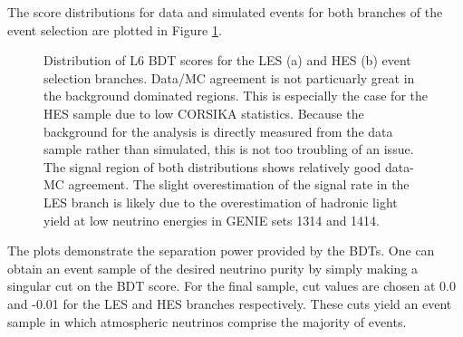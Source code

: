 \documentclass{gatech-thesis}
\begin{document}
The score distributions for data and simulated events for both branches of the event selection are plotted in Figure \ref{fig:BDTScoreDistros}.
\begin{figure}
\centering
{}
\caption[L6 BDT Score Distribution]{Distribution of L6 BDT scores for the LES (a) and HES (b) event selection branches. Data/MC agreement is not particuarly great in the background dominated regions. This is especially the case for the HES sample due to low CORSIKA statistics. Because the background for the analysis is directly measured from the data sample rather than simulated, this is not too troubling of an issue. The signal region of both distributions shows relatively good data-MC agreement. The slight overestimation of the signal rate in the LES branch is likely due to the overestimation of hadronic light yield at low neutrino energies in GENIE sets 1314 and 1414.}
\label{fig:BDTScoreDistros}
\end{figure}
The plots demonstrate the separation power provided by the BDTs. One can obtain an event sample of the desired neutrino purity by simply making a singular cut on the BDT score. For the final sample, cut values are chosen at 0.0 and -0.01 for the LES and HES branches respectively. These cuts yield an event sample in which atmospheric neutrinos comprise the majority of events.
\end{document}
